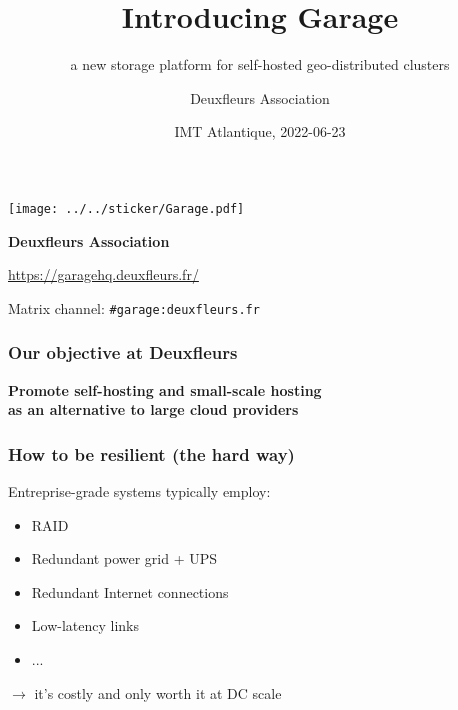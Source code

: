 \documentclass[aspectratio=169]{beamer}
\title{Introducing Garage}
\subtitle{a new storage platform for self-hosted geo-distributed clusters}
\author{Deuxfleurs Association}
\date{IMT Atlantique, 2022-06-23}
\begin{document}
\begin{frame}
	\centering
	\texttt{[image: ../../sticker/Garage.pdf]}
	\vspace{1em}

	{\large\bf Deuxfleurs Association}
	\vspace{1em}

	\url{https://garagehq.deuxfleurs.fr/}

	Matrix channel: \texttt{\#garage:deuxfleurs.fr}
\end{frame}

\begin{frame}
	\frametitle{Our objective at Deuxfleurs}
	
	\begin{center}
		\textbf{Promote self-hosting and small-scale hosting\\
			as an alternative to large cloud providers}
	\end{center}
	\vspace{2em}
\end{frame}

\begin{frame}
	\frametitle{How to be resilient (the hard way)}

	Entreprise-grade systems typically employ:
	\vspace{1em}
	\begin{itemize}
		\item RAID
		\item Redundant power grid + UPS
		\item Redundant Internet connections
		\item Low-latency links
		\item ... 
	\end{itemize}
	\vspace{1em}
	$\to$ it's costly and only worth it at DC scale
\end{frame}
\end{document}
